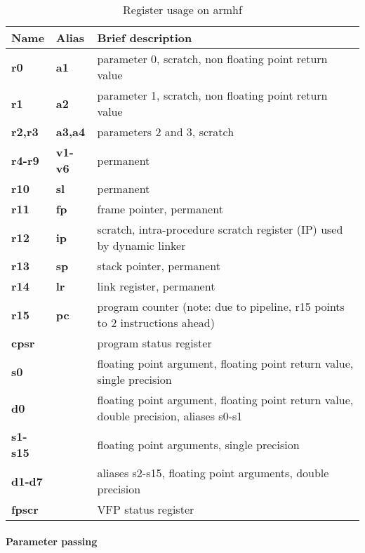 \begin{table}[h]
\begin{tabular*}{0.95\textwidth}{lll}
Name         & Alias       &  Brief description\\
\hline          
{\bf r0}     & {\bf a1}    &  parameter 0, scratch, non floating point return value\\
{\bf r1}     & {\bf a2}    &  parameter 1, scratch, non floating point return value\\
{\bf r2,r3}  & {\bf a3,a4} &  parameters 2 and 3, scratch\\
{\bf r4-r9}  & {\bf v1-v6} &  permanent\\
{\bf r10}    & {\bf sl}    &  permanent\\
{\bf r11}    & {\bf fp}    &  frame pointer, permanent\\
{\bf r12}    & {\bf ip}    &  scratch, intra-procedure scratch register (IP) used by dynamic linker\\
{\bf r13}    & {\bf sp}    &  stack pointer, permanent\\
{\bf r14}    & {\bf lr}    &  link register, permanent\\
{\bf r15}    & {\bf pc}    &  program counter (note: due to pipeline, r15 points to 2 instructions ahead)\\
{\bf cpsr}   &             &  program status register\\
{\bf s0}     &             &  floating point argument, floating point return value, single precision\\
{\bf d0}     &             &  floating point argument, floating point return value, double precision, aliases s0-s1\\
{\bf s1-s15} &             &  floating point arguments, single precision\\
{\bf d1-d7}  &             &  aliases s2-s15, floating point arguments, double precision\\
{\bf fpscr}  &             &  VFP status register\\
\end{tabular*}
\caption{Register usage on armhf}
\end{table}

\paragraph{Parameter passing}

